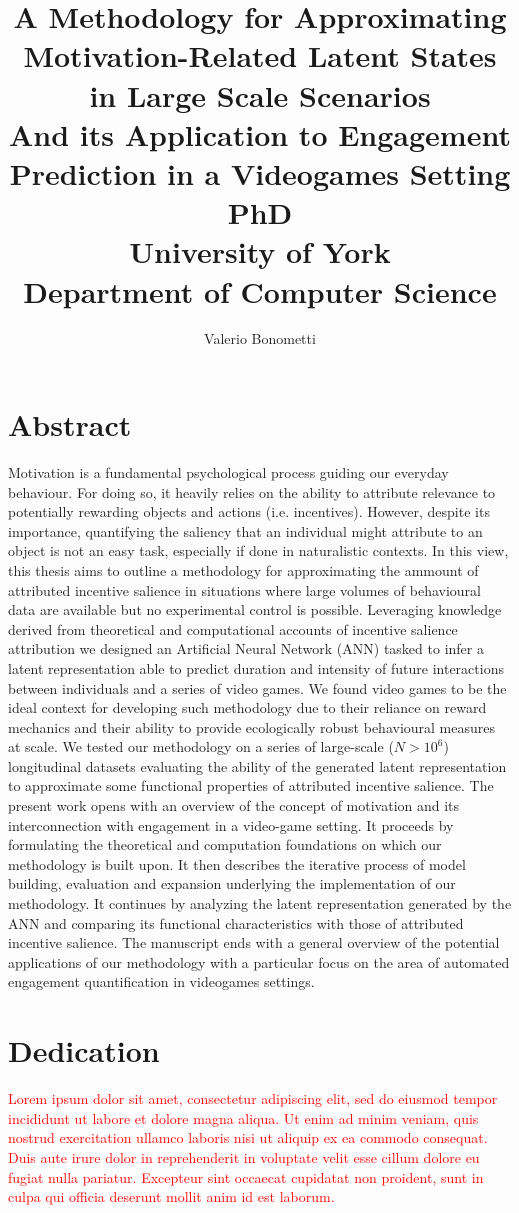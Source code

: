 \documentclass{yorkThesis}
\title{
{A Methodology for Approximating Motivation-Related Latent States in Large Scale Scenarios}\\
{\small And its Application to Engagement Prediction in a Videogames Setting}\\
{\Large PhD}\\
{\large University of York}\\
{\large Department of Computer Science}\\

}
\author{Valerio Bonometti}
\newcommand{\lorem}{\textcolor{red}{Lorem ipsum dolor sit amet, consectetur adipiscing elit, sed do eiusmod tempor incididunt ut labore et dolore magna aliqua. Ut enim ad minim veniam, quis nostrud exercitation ullamco laboris nisi ut aliquip ex ea commodo consequat. Duis aute irure dolor in reprehenderit in voluptate velit esse cillum dolore eu fugiat nulla pariatur. Excepteur sint occaecat cupidatat non proident, sunt in culpa qui officia deserunt mollit anim id est laborum.\\}}
\begin{document}
\listoffigures
\listoftables

\maketitle

\chapter*{Abstract}
\label{abstract}
Motivation is a fundamental psychological process guiding our everyday behaviour. For doing so, it heavily relies on the ability to attribute relevance to potentially rewarding objects and actions (i.e. incentives). However, despite its importance, quantifying the saliency that an individual might attribute to an object is not an easy task, especially if done in naturalistic contexts. In this view, this thesis aims to outline a methodology for approximating the ammount of attributed incentive salience in situations where large volumes of behavioural data are available but no experimental control is possible. Leveraging knowledge derived from theoretical and computational accounts of incentive salience attribution we designed an Artificial Neural Network (ANN) tasked to infer a latent representation able to predict duration and intensity of future interactions between individuals and a series of video games. We found video games to be the ideal context for developing such methodology due to their reliance on reward mechanics and their ability to provide ecologically robust behavioural measures at scale. We tested our methodology on a series of large-scale ($N> 10^6$) longitudinal datasets evaluating the ability of the generated latent representation to approximate some functional properties of attributed incentive salience. The present work opens with an overview of the concept of motivation and its interconnection with engagement in a video-game setting. It proceeds by formulating the theoretical and computation foundations on which our methodology is built upon. It then describes the iterative process of model building, evaluation and expansion underlying the implementation of our methodology. It continues by analyzing the latent representation generated by the ANN and comparing its functional characteristics with those of attributed incentive salience. The manuscript ends with a general overview of the potential applications of our methodology with a particular focus on the area of automated engagement quantification in videogames settings.

\chapter*{Dedication}
\label{dedication}
\lorem
\end{document}
